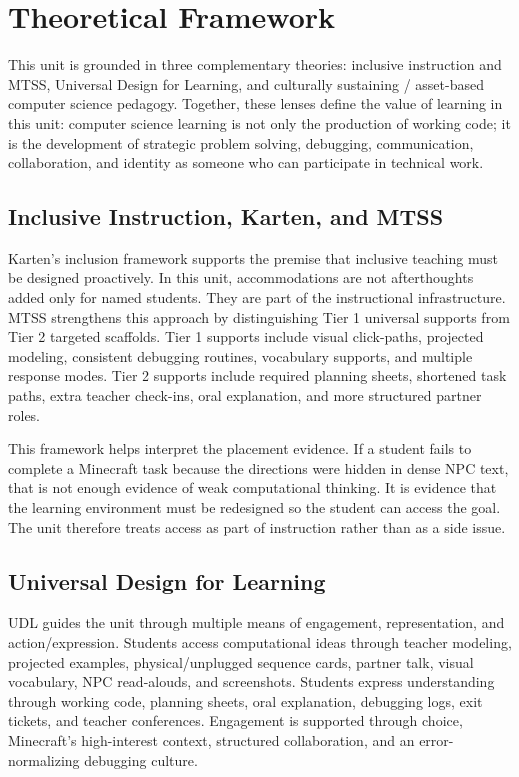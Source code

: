 \documentclass[12pt]{article}
\begin{document}
\section{Theoretical Framework}
This unit is grounded in three complementary theories: inclusive instruction and MTSS, Universal Design for Learning, and culturally sustaining / asset-based computer science pedagogy. Together, these lenses define the value of learning in this unit: computer science learning is not only the production of working code; it is the development of strategic problem solving, debugging, communication, collaboration, and identity as someone who can participate in technical work.

\subsection{Inclusive Instruction, Karten, and MTSS}
Karten's inclusion framework supports the premise that inclusive teaching must be designed proactively. In this unit, accommodations are not afterthoughts added only for named students. They are part of the instructional infrastructure. MTSS strengthens this approach by distinguishing Tier 1 universal supports from Tier 2 targeted scaffolds. Tier 1 supports include visual click-paths, projected modeling, consistent debugging routines, vocabulary supports, and multiple response modes. Tier 2 supports include required planning sheets, shortened task paths, extra teacher check-ins, oral explanation, and more structured partner roles.

This framework helps interpret the placement evidence. If a student fails to complete a Minecraft task because the directions were hidden in dense NPC text, that is not enough evidence of weak computational thinking. It is evidence that the learning environment must be redesigned so the student can access the goal. The unit therefore treats access as part of instruction rather than as a side issue.

\subsection{Universal Design for Learning}
UDL guides the unit through multiple means of engagement, representation, and action/expression. Students access computational ideas through teacher modeling, projected examples, physical/unplugged sequence cards, partner talk, visual vocabulary, NPC read-alouds, and screenshots. Students express understanding through working code, planning sheets, oral explanation, debugging logs, exit tickets, and teacher conferences. Engagement is supported through choice, Minecraft's high-interest context, structured collaboration, and an error-normalizing debugging culture.
\end{document}
